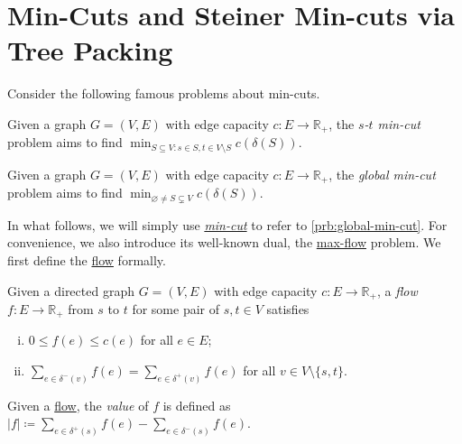 \section{Min-Cuts and Steiner Min-cuts via Tree Packing}
Consider the following famous problems about min-cuts.

\begin{problem}\label{prb:s-t-min-cut}
Given a graph \(G = (V, E)\) with edge capacity \(c \colon E \to \mathbb{R} _{+} \), the \emph{\(s\)-\(t\) min-cut} problem aims to find \(\min _{S \subseteq V \colon s \in S, t \in V\setminus S} c(\delta (S))\).
\end{problem}

\begin{problem}\label{prb:global-min-cut}
Given a graph \(G = (V, E)\) with edge capacity \(c \colon E \to \mathbb{R} _{+} \), the \emph{global min-cut} problem aims to find \(\min _{\varnothing \neq S \subsetneq V} c(\delta (S))\).
\end{problem}

In what follows, we will simply use \hyperref[prb:global-min-cut]{\emph{min-cut}} to refer to \autoref{prb:global-min-cut}. For convenience, we also introduce its well-known dual, the \hyperref[prb:s-t-max-flow]{max-flow} problem. We first define the \hyperref[def:flow]{flow} formally.

\begin{definition}[Flow]\label{def:flow}
	Given a directed graph \(G = (V, E)\) with edge capacity \(c \colon E \to \mathbb{R} _{+}\), a \emph{flow} \(f\colon E \to \mathbb{R} _{+}\) from \(s\) to \(t\) for some pair of \(s, t \in V\) satisfies
	\begin{enumerate}[(i)]
		\item\label{def:flow-capacity} \(0 \leq f(e) \leq c(e)\) for all \(e \in E\);
		\item\label{def:flow-conservation} \(\sum_{e \in \delta ^- (v)} f(e) = \sum_{e \in \delta ^+ (v)} f(e)\) for all \(v \in V\setminus \{ s, t \} \).
	\end{enumerate}
\end{definition}

\begin{notation}[Value]
	Given a \hyperref[def:flow]{flow}, the \emph{value} of \(f\) is defined as \(\lvert f \rvert \coloneqq \sum_{e \in \delta ^+(s)} f(e) - \sum_{e \in \delta ^-(s)} f(e)\).
\end{notation}

